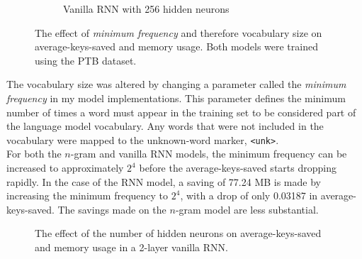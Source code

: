 \documentclass[a4paper, 12pt]{report}
\newcommand{\ttt}[1]{\texttt{#1}}
\newcommand{\tit}[1]{\textit{#1}}
\begin{document}
\begin{figure}[h]
\begin{subfigure}{0.5\linewidth}
	\caption{Vanilla RNN with 256 hidden neurons}
\end{subfigure}
\caption{The effect of \tit{minimum frequency} and therefore vocabulary size on average-keys-saved and memory usage. Both models were trained using the PTB dataset.}
\end{figure}

The vocabulary size was altered by changing a parameter called the \tit{minimum frequency} in my model implementations. This parameter defines the minimum number of times a word must appear in the training set to be considered part of the language model vocabulary. Any words that were not included in the vocabulary were mapped to the unknown-word marker, \ttt{<unk>}. \\

For both the $n$-gram and vanilla RNN models, the minimum frequency can be increased to approximately $2^4$ before the average-keys-saved starts dropping rapidly. In the case of the RNN model, a saving of 77.24 MB is made by increasing the minimum frequency to $2^4$, with a drop of only 0.03187 in average-keys-saved. The savings made on the $n$-gram model are less substantial. \\

\begin{figure}[h]
\captionsetup{justification=centering}
\centering
{}
\caption{The effect of the number of hidden neurons on average-keys-saved and memory usage in a 2-layer vanilla RNN.}
\label{fig:average_keys_saved_vs_number_of_hidden_neurons}
\end{figure}
\end{document}
